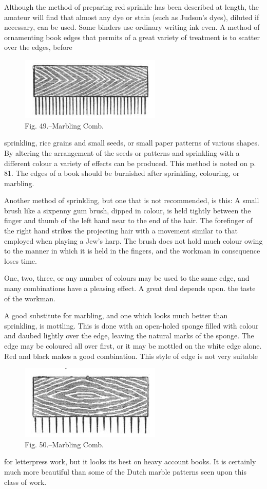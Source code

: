 \documentclass[twoside]{book}
\begin{document}
Although the method of preparing red sprinkle
has been described at length, the amateur will find
that almost any dye or stain (such as Judson's dyes),
diluted if necessary, can be used. Some binders
use ordinary writing ink even. A method of ornamenting
book edges that permits of a great variety
of treatment is to scatter over the edges, before
	\begin{figure}[h]
		\centering
		\includegraphics[width=0.6\textwidth]{Figures/_049.png}
		\caption*{Fig. 49.--Marbling Comb.}
	\end{figure}
sprinkling, rice grains and small seeds, or small
paper patterns of various shapes. By altering the
arrangement of the seeds or patterns and sprinkling
with a different colour a variety of effects can be
produced. This method is noted on p. 81. The
edges of a book should be burnished after sprinkling,
colouring, or marbling.

Another method of sprinkling, but one that is not
recommended, is this: A small brush like a sixpenny
gum brush, dipped in colour, is held tightly between
the finger and thumb of the left hand near to the
end of the hair. The forefinger of the right hand
strikes the projecting hair with a movement similar
to that employed when playing a Jew's harp. The
brush does not hold much colour owing to the
\pagebreak
manner in which it is held in the fingers, and the
workman in consequence loses time.

One, two, three, or any number of colours may
be used to the same edge, and many combinations
have a pleasing effect. A great deal depends upon.
the taste of the workman.

A good substitute for marbling, and one which
looks much better than sprinkling, is mottling. This
is done with an open-holed sponge filled with colour
and daubed lightly over the edge, leaving the
natural marks of the sponge. The edge may be
coloured all over first, or it may be mottled on the
white edge alone. Red and black makes a good
combination. This style of edge is not very suitable
	\begin{figure}[h]
		\centering
		\includegraphics[width=0.6\textwidth]{Figures/_050.png}
		\caption*{Fig. 50.--Marbling Comb.}
	\end{figure}
for letterpress work, but it looks its best on heavy
account books. It is certainly much more beautiful
than some of the Dutch marble patterns seen upon
this class of work.
\end{document}
